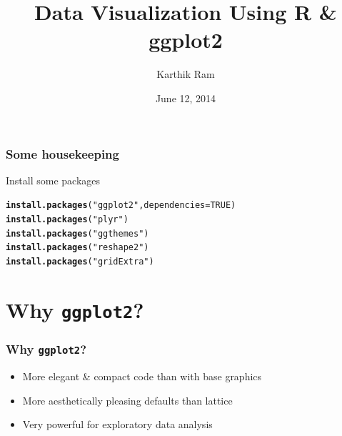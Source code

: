 \documentclass{beamer}\usepackage[]{graphicx}\usepackage[]{color}
\makeatletter
\newcommand{\hlnum}[1]{\textcolor[rgb]{0.686,0.059,0.569}{#1}}%
\newcommand{\hlstr}[1]{\textcolor[rgb]{0.192,0.494,0.8}{#1}}%
\newcommand{\hlstd}[1]{\textcolor[rgb]{0.345,0.345,0.345}{#1}}%
\newcommand{\hlkwc}[1]{\textcolor[rgb]{0.333,0.667,0.333}{#1}}%
\newcommand{\hlkwd}[1]{\textcolor[rgb]{0.737,0.353,0.396}{\textbf{#1}}}%
\newenvironment{kframe}{%
 \def\at@end@of@kframe{}%
 \ifinner\ifhmode%
  \def\at@end@of@kframe{\end{minipage}}%
  \begin{minipage}{\columnwidth}%
 \fi\fi%
 \def\FrameCommand##1{\hskip\@totalleftmargin \hskip-\fboxsep
 \colorbox{shadecolor}{##1}\hskip-\fboxsep
     \hskip-\linewidth \hskip-\@totalleftmargin \hskip\columnwidth}%
 \MakeFramed {\advance\hsize-\width
   \@totalleftmargin\z@ \linewidth\hsize
   \@setminipage}}%
 {\par\unskip\endMakeFramed%
 \at@end@of@kframe}
\newenvironment{knitrout}{}{} %
\makeatother
\begin{document}

\title{Data Visualization Using R \& ggplot2}
\author{Karthik Ram}
\date{June 12, 2014}
\maketitle


\begin{frame}[fragile]
\frametitle{Some housekeeping}
Install some packages
\begin{knitrout}\footnotesize
{}\color{fgcolor}\begin{kframe}
\begin{alltt}
\hlkwd{install.packages}\hlstd{(}\hlstr{"ggplot2"}\hlstd{,} \hlkwc{dependencies} \hlstd{=} \hlnum{TRUE}\hlstd{)}
\hlkwd{install.packages}\hlstd{(}\hlstr{"plyr"}\hlstd{)}
\hlkwd{install.packages}\hlstd{(}\hlstr{"ggthemes"}\hlstd{)}
\hlkwd{install.packages}\hlstd{(}\hlstr{"reshape2"}\hlstd{)}
\hlkwd{install.packages}\hlstd{(}\hlstr{"gridExtra"}\hlstd{)}
\end{alltt}
\end{kframe}
\end{knitrout}
\end{frame}


\section*{Why \texttt{ggplot2}?}
\frame{\sectionpage}


\begin{frame}[fragile]
\frametitle{Why \texttt{ggplot2}?}
\begin{itemize}
\item More elegant \& compact code than with base graphics\\
\item More aesthetically pleasing defaults than lattice\\
\item Very powerful for exploratory data analysis\\
\end{itemize}
\end{frame}
\end{document}
